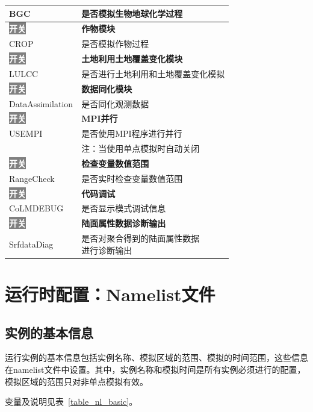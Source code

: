 \documentclass[a4paper,12pt,twoside]{article}
\begin{document}
{\begin{longtable}{ll}
BGC &  是否模拟生物地球化学过程 \\
\hline
\colorbox{gray}{\textcolor{white}{\bf{开关}}} & \bf{作物模块} \\
CROP &  是否模拟作物过程 \\
\hline
\colorbox{gray}{\textcolor{white}{\bf{开关}}} & \bf{土地利用土地覆盖变化模块} \\
LULCC &  是否进行土地利用和土地覆盖变化模拟 \\
\hline
\colorbox{gray}{\textcolor{white}{\bf{开关}}} & \bf{数据同化模块} \\
DataAssimilation &  是否同化观测数据 \\
\hline
\colorbox{gray}{\textcolor{white}{\bf{开关}}} & \bf{MPI并行} \\
USEMPI &  是否使用MPI程序进行并行 \\
 & 注：当使用单点模拟时自动关闭 \\
\hline
\colorbox{gray}{\textcolor{white}{\bf{开关}}} & \bf{检查变量数值范围} \\
RangeCheck &  是否实时检查变量数值范围 \\
\hline
\colorbox{gray}{\textcolor{white}{\bf{开关}}} & \bf{代码调试} \\
CoLMDEBUG &  是否显示模式调试信息 \\
\hline
\colorbox{gray}{\textcolor{white}{\bf{开关}}} & \bf{陆面属性数据诊断输出} \\
SrfdataDiag &  \makecell[l]{是否对聚合得到的陆面属性数据\\进行诊断输出} \\

\end{longtable}}

\section{运行时配置：Namelist文件}\label{nml}

\subsection{实例的基本信息}
运行实例的基本信息包括实例名称、模拟区域的范围、模拟的时间范围，这些信息在namelist文件中设置。其中，实例名称和模拟时间是所有实例必须进行的配置，模拟区域的范围只对非单点模拟有效。

变量及说明见表~\ref{table_nl_basic}。
\end{document}
